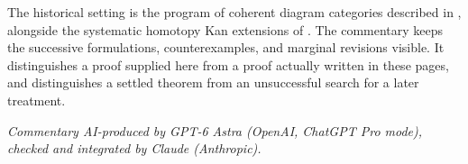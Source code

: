 The historical setting is the program of coherent diagram categories described in \citet[\S69]{Grothendieck1983}, alongside the systematic homotopy Kan extensions of \citet{Heller1988}. The commentary keeps the successive formulations, counterexamples, and marginal revisions visible. It distinguishes a proof supplied here from a proof actually written in these pages, and distinguishes a settled theorem from an unsuccessful search for a later treatment.

\medskip
\noindent\small\textit{Commentary AI-produced by GPT-6 Astra (OpenAI, ChatGPT Pro mode), checked and integrated by Claude (Anthropic).}
\endgroup
